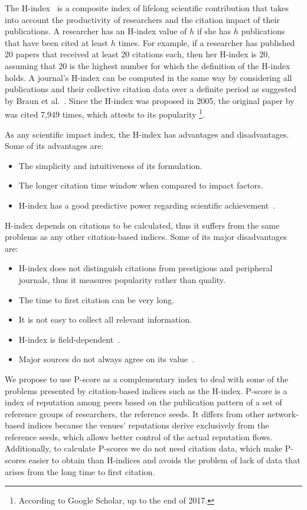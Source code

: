 \documentclass[notitlepage]{svjour3}
\begin{document}
The H-index~\cite{Hirsch2005} is a composite index of lifelong scientific contribution that takes 
into account the productivity of researchers and the citation impact of their publications.
A researcher has an H-index value of $ h $ if she has $ h $ publications that have been cited at 
least $ h $ times. For example, if a researcher has published 20 papers that received at least 20 
citations each, then her H-index is 20, assuming that 20 is the highest number for which the 
definition of the H-index holds. A journal's H-index can be computed 
in the same way by considering all publications and their collective citation data over a 
definite period as suggested by Braun et al.~\cite{Braun2006}.
Since the H-index was proposed in 2005, the original paper by~\cite{Hirsch2005} was 
cited 7,949 times, which attests to its popularity 
\footnote{According to Google Scholar, up to the end of 2017.}.

As any scientific impact index, the H-index has advantages and disadvantages. 
Some of its advantages are:

\begin{itemize}
\item The simplicity and intuitiveness of its formulation.
\item The longer citation time window when compared to impact factors.
\item H-index has a good predictive power regarding scientific achievement~\cite{Bornmann2005,Hirsch2007}.
\end{itemize}

H-index depends on citations to be calculated, thus it suffers from the 
same problems as any other citation-based indices. Some of its major disadvantages are:

\begin{itemize}
\item H-index does not distinguish citations from prestigious and peripheral journals, thus 
it measures popularity rather than quality.
\item The time to first citation can be very long.
\item It is not easy to collect all relevant information.
\item H-index is field-dependent~\cite{Wendl2007}.
\item Major sources do not always agree on its value~\cite{Bar-Ilan2008}. 
\end{itemize}

We propose to use P-score as a complementary index to deal with some of the problems
presented by citation-based indices such as the H-index.
P-score is a index of reputation among peers based on the publication pattern of a set of
reference groups of researchers, the reference seeds. It differs from other network-based 
indices because the venues' reputations derive exclusively from the reference seeds, which 
allows better control of the actual reputation flows. Additionally, to calculate P-scores we 
do not need citation data, which make P-scores easier to obtain than H-indices and avoids 
the problem of lack of data that arises from the long time to first citation.
\end{document}
